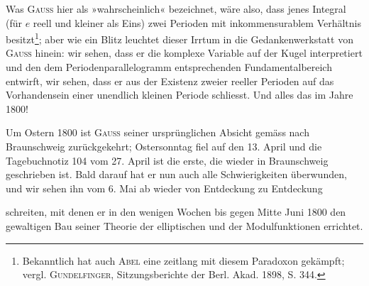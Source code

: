 Was \textsc{Gauss} hier als »wahrscheinlich« bezeichnet, wäre also, dass jenes
Integral (für \(e\) reell und kleiner als Eins) zwei  Perioden mit inkommensurablem
Verhältnis besitzt\footnote{Bekanntlich hat auch \textsc{Abel} eine zeitlang mit diesem Paradoxon gekämpft; vergl. \textsc{Gundelfinger}, Sitzungsberichte der Berl. Akad. 1898, S. 344.}; aber wie ein Blitz leuchtet dieser Irrtum
in die Gedankenwerkstatt von \textsc{Gauss} hinein: wir sehen, dass er die komplexe
Variable auf der Kugel interpretiert und den dem Periodenparallelogramm
entsprechenden Fundamentalbereich entwirft, wir sehen, dass er aus der Existenz
zweier reeller Perioden auf das Vorhandensein einer unendlich kleinen
Periode schliesst. Und alles das im Jahre 1800!

Um Ostern 1800 ist \textsc{Gauss} seiner ursprünglichen Absicht gemäss nach
Braunschweig zurückgekehrt; Ostersonntag fiel auf den 13. April und die
Tagebuchnotiz 104 vom 27. April ist die erste, die wieder in Braunschweig
geschrieben ist. Bald darauf hat er nun auch alle Schwierigkeiten überwunden,
und wir sehen ihn vom 6. Mai ab wieder von Entdeckung zu Entdeckung\par
\clearpage{}
\noindent schreiten, mit denen er in den wenigen Wochen bis gegen Mitte Juni 1800
den gewaltigen Bau seiner Theorie der elliptischen und der Modulfunktionen
errichtet.
